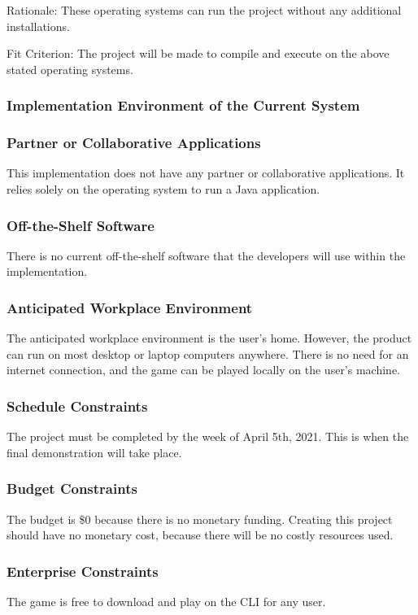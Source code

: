 \documentclass[12pt, titlepage]{article}
\begin{document}
\noindent Rationale: These operating systems can run the project without any additional installations.

\noindent Fit Criterion: The project will be made to compile and execute on the above stated operating systems.

\subsubsection{Implementation Environment of the Current System}


\subsubsection{Partner or Collaborative Applications}
This implementation does not have any partner or collaborative applications. It relies solely on the operating system to run a Java application.

\subsubsection{Off-the-Shelf Software}
There is no current off-the-shelf software that the developers will use within the implementation. 

\subsubsection{Anticipated Workplace Environment}
The anticipated workplace environment is the user's home. However, the product can run on most desktop or laptop computers anywhere. There is no need for an internet connection, and the game can be played locally on the user's machine.

\subsubsection{Schedule Constraints}
The project must be completed by the week of April 5th, 2021. This is when the final demonstration will take place.

\subsubsection{Budget Constraints}
The budget is \$0 because there is no monetary funding. Creating this project should have no monetary cost, because there will be no costly resources used.

\subsubsection{Enterprise Constraints}
The game is free to download and play on the CLI for any user.
\end{document}
